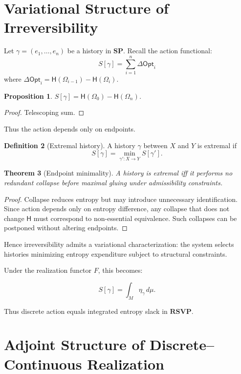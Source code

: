 \documentclass[12pt,a4paper]{article}
\newtheorem{theorem}{Theorem}[section]
\newtheorem{proposition}[theorem]{Proposition}
\theoremstyle{definition}
\newtheorem{definition}[theorem]{Definition}
\theoremstyle{remark}
\newcommand{\Ent}{\mathsf{H}}
\newcommand{\Opt}{\mathsf{Opt}}
\newcommand{\SP}{\mathbf{SP}}
\newcommand{\RSVP}{\mathbf{RSVP}}
\begin{document}
\section{Variational Structure of Irreversibility}
\label{sec:variational}

Let $\gamma = (e_1,\dots,e_n)$ be a history in $\SP$.
Recall the action functional:
\[
  S[\gamma] = \sum_{i=1}^n \Delta\Opt_i
\]
where $\Delta\Opt_i = \Ent(\Omega_{i-1}) - \Ent(\Omega_i)$.

\begin{proposition}
$S[\gamma] = \Ent(\Omega_0) - \Ent(\Omega_n)$.
\end{proposition}

\begin{proof}
Telescoping sum.
\end{proof}

Thus the action depends only on endpoints.

\begin{definition}[Extremal history]
A history $\gamma$ between $X$ and $Y$ is extremal if
\[
  S[\gamma] = \min_{\gamma' : X \to Y} S[\gamma'].
\]
\end{definition}

\begin{theorem}[Endpoint minimality]
A history is extremal iff it performs no redundant collapse before
maximal gluing under admissibility constraints.
\end{theorem}

\begin{proof}
Collapse reduces entropy but may introduce unnecessary identification.
Since action depends only on entropy difference, any collapse that does
not change $\Ent$ must correspond to non-essential equivalence.
Such collapses can be postponed without altering endpoints.
\end{proof}

Hence irreversibility admits a variational characterization: the system
selects histories minimizing entropy expenditure subject to structural
constraints.

Under the realization functor $F$, this becomes:

\[
  S[\gamma] = \int_{M} \eta_\gamma \, d\mu.
\]

Thus discrete action equals integrated entropy slack in $\RSVP$.

\section{Adjoint Structure of Discrete–Continuous Realization}
\label{sec:adjunction}
\end{document}
